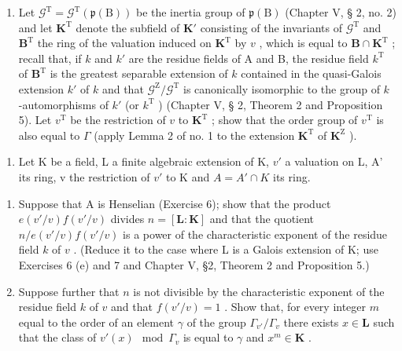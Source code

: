 \begin{enumerate}
\item
  Let \(\mathcal{G}^{\mathrm{T}} = \mathcal{G}^{\mathrm{T}}(\mathfrak{p}(\mathrm{B}))\) be the inertia group of \(\mathfrak{p}(\mathrm{B})\) (Chapter V, § 2, no. 2) and let \(\mathbf{K}^{\mathrm{T}}\) denote the subfield of \(\mathbf{K}'\) consisting of the invariants of \(\mathcal{G}^{\mathrm{T}}\) and \(\mathbf{B}^{\mathrm{T}}\) the ring of the valuation induced on \(\mathbf{K}^{\mathrm{T}}\) by \(v\) , which is equal to \(\mathbf{B} \cap \mathbf{K}^{\mathrm{T}}\) ; recall that, if \(k\) and \(k'\) are the residue fields of A and B, the residue field \(k^{\mathrm{T}}\) of \(\mathbf{B}^{\mathrm{T}}\) is the greatest separable extension of \(k\) contained in the quasi-Galois extension \(k'\) of \(k\) and that \(\mathcal{G}^{\mathrm{Z}} / \mathcal{G}^{\mathrm{T}}\) is canonically isomorphic to the group of \(k\) -automorphisms of \(k'\) (or \(k^{\mathrm{T}}\) ) (Chapter V, § 2, Theorem 2 and Proposition 5). Let \(v^{\mathrm{T}}\) be the restriction of \(v\) to \(\mathbf{K}^{\mathrm{T}}\) ; show that the order group of \(v^{\mathrm{T}}\) is also equal to \(\Gamma\) (apply Lemma 2 of no. 1 to the extension \(\mathbf{K}^{\mathrm{T}}\) of \(\mathbf{K}^{\mathrm{Z}}\) ).
\end{enumerate}

\begin{enumerate}
\def\labelenumi{\arabic{enumi}.}
\setcounter{enumi}{8}
\tightlist
\item
  Let K be a field, L a finite algebraic extension of K, \(v'\) a valuation on L, A' its ring, v the restriction of \(v'\) to K and \(A = A' \cap K\) its ring.
\end{enumerate}

\begin{enumerate}
\def\labelenumi{(\alph{enumi})}
\item
  Suppose that A is Henselian (Exercise 6); show that the product \(e(v'/v)f(v'/v)\) divides \(n = [\mathbf{L}:\mathbf{K}]\) and that the quotient \(n / e(v'/v)f(v'/v)\) is a power of the characteristic exponent of the residue field \(k\) of \(v\) . (Reduce it to the case where L is a Galois extension of K; use Exercises 6 (e) and 7 and Chapter V, §2, Theorem 2 and Proposition 5.)
\item
  Suppose further that \(n\) is not divisible by the characteristic exponent of the residue field \(k\) of \(v\) and that \(f(v' / v) = 1\) . Show that, for every integer \(m\) equal to the order of an element \(\gamma\) of the group \(\Gamma_{v'} / \Gamma_v\) there exists \(x \in \mathbf{L}\) such that the class of \(v'(x) \mod \Gamma_v\) is equal to \(\gamma\) and \(x^m \in \mathbf{K}\) .
\end{enumerate}

